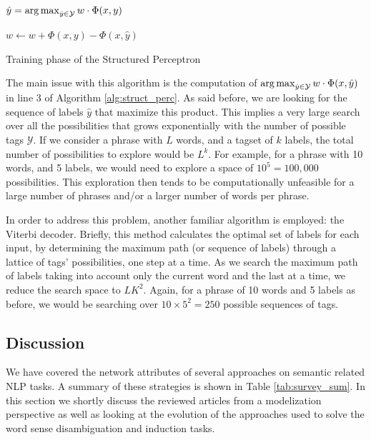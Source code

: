 \begin{algorithm}[htp]
\SetAlgoLined
{}
{
	{
	
		$\hat{y}= \argmax_{\hat{y}\in \mathcal{Y}}w\cdot \Phi(x,y)$
		
		{	
			$w \leftarrow w+\Phi(x,y) - \Phi(x,\hat{y})$
		}
	}
}



\caption{Training phase of the Structured Perceptron}
\label{alg:struct_perc}
\end{algorithm}


The main issue with this algorithm is the computation of $\argmax_{\hat{y}\in \mathcal{Y}}w\cdot \Phi(x,\hat{y})$ in line 3 of Algorithm \ref{alg:struct_perc}. As said before, we are looking for the sequence of labels $\hat{y}$  that maximize this product. This implies a very large search over all the possibilities that grows exponentially with the number of possible tags $\mathcal{Y}$. If we consider a phrase with $L$ words, and a tagset of $k$ labels, the total number of possibilities to explore would be $L^k$. For example, for a phrase with 10 words, and 5 labels, we would need to explore a space of $10^5=100,000$ possibilities. This exploration then tends to be computationally unfeasible for a large number of phrases and/or a larger number of words per phrase.

In order to address this problem, another familiar  algorithm is employed: the Viterbi decoder. Briefly, this method calculates the optimal set of labels for each input, by determining the maximum path (or sequence of labels) through a lattice of tags' possibilities, one step at a time. As we search the maximum path of labels taking into account only the current word and the last at a time, we reduce the search space to $LK^2$. Again, for a phrase of 10 words and 5 labels as before, we would be searching over $10\times 5^2=250$ possible sequences of tags.




\subsection{Discussion}\label{sec:disc_chap3}
We have covered the network attributes of several approaches on semantic related NLP tasks. A summary of these strategies is shown in Table \ref{tab:survey_sum}.
In this section we shortly discuss the reviewed articles from a  modelization perspective as well as looking at the evolution of the approaches used to solve the word sense disambiguation and induction tasks.


